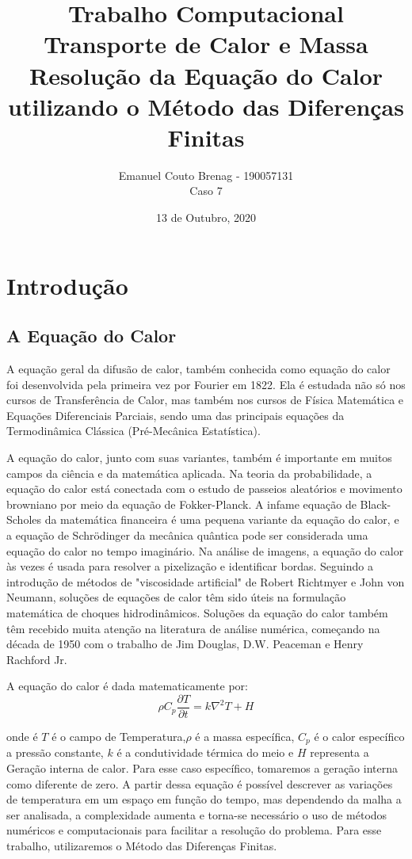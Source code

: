 \documentclass[article]{abntex2}
\title{Trabalho Computacional\\ Transporte de Calor e Massa\\ Resolução da Equação do Calor utilizando o Método das Diferenças Finitas}
\author{
 Emanuel Couto Brenag - 190057131
 \\Caso 7}
\date{13 de Outubro, 2020}
\begin{document}
            
\maketitle    
\thispagestyle{empty}
\clearpage
\pagestyle{plain}
\newpage
\section{Introdução}
\subsection{A Equação do Calor}

 A equação geral da difusão de calor, também conhecida como equação do calor foi desenvolvida pela primeira vez por Fourier em 1822. Ela é estudada não só nos cursos de Transferência de Calor, mas também nos cursos de Física Matemática e Equações Diferenciais Parciais, sendo uma das principais equações da Termodinâmica Clássica (Pré-Mecânica Estatística). 
 
 A equação do calor, junto com suas variantes, também é importante em muitos campos da ciência e da matemática aplicada. Na teoria da probabilidade, a equação do calor está conectada com o estudo de passeios aleatórios e movimento browniano por meio da equação de Fokker-Planck. A infame equação de Black-Scholes da matemática financeira é uma pequena variante da equação do calor, e a equação de Schrödinger da mecânica quântica pode ser considerada uma equação do calor no tempo imaginário. Na análise de imagens, a equação do calor às vezes é usada para resolver a pixelização e identificar bordas. Seguindo a introdução de métodos de "viscosidade artificial" de Robert Richtmyer e John von Neumann, soluções de equações de calor têm sido úteis na formulação matemática de choques hidrodinâmicos. Soluções da equação do calor também têm recebido muita atenção na literatura de análise numérica, começando na década de 1950 com o trabalho de Jim Douglas, D.W. Peaceman e Henry Rachford Jr.
 
 A equação do calor é dada matematicamente por:
 $$ \rho C_{p} \frac{\partial T}{\partial t} = k \nabla^{2}T+H$$
 
 
onde é $T$ é o campo de Temperatura,$\rho$ é a massa específica, $C_{p}$ é o calor específico a pressão constante, $k$ é a condutividade térmica do meio e $H$ representa a Geração interna de calor. Para esse caso específico, tomaremos a geração interna como diferente de zero. A partir dessa equação é possível descrever as variações de temperatura em um espaço em função do tempo, mas dependendo da malha a ser analisada, a complexidade aumenta e torna-se necessário o uso de métodos numéricos e computacionais para facilitar a resolução do problema. Para esse trabalho, utilizaremos o Método das Diferenças Finitas.
\end{document}
